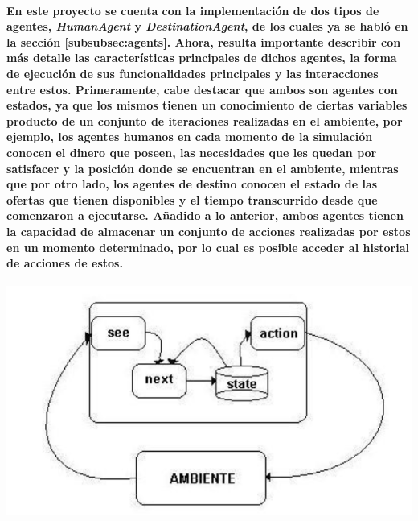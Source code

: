 \documentclass[12pt]{amsart}
\begin{document}
\paragraph{En este proyecto se cuenta con la implementación de dos tipos de agentes, \textit{HumanAgent} y \textit{DestinationAgent}, de los cuales ya se habló en la sección \ref{subsubsec:agents}. Ahora, resulta importante describir con más detalle las características principales de dichos agentes, la forma de ejecución de sus funcionalidades principales y las interacciones entre estos. Primeramente, cabe destacar que ambos son agentes con estados, ya que los mismos tienen un conocimiento de ciertas variables producto de un conjunto de iteraciones realizadas en el ambiente, por ejemplo, los agentes humanos en cada momento de la simulación conocen el dinero que poseen, las necesidades que les quedan por satisfacer y la posición donde se encuentran en el ambiente,  mientras que por otro lado, los agentes de destino conocen el estado de las ofertas que tienen disponibles y el tiempo transcurrido desde que comenzaron a ejecutarse. Añadido a lo anterior, ambos agentes tienen la capacidad de almacenar un conjunto de acciones realizadas por estos en un momento determinado, por lo cual es posible acceder al historial de acciones de estos.}


	\includegraphics[scale=0.7]{./images/stateagents.png}
	\label{fig:stateagents}
\end{document}
